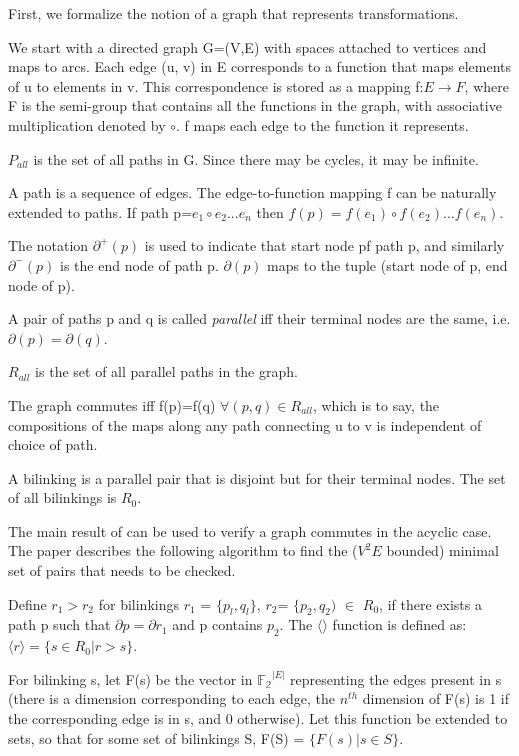 \documentclass{article}
\begin{document}
First, we formalize the notion of a graph that represents transformations.

We start with a directed graph G=(V,E) with spaces attached to vertices and maps to arcs. Each edge (u, v) in E corresponds to a function that maps elements of u to elements in v. 
This correspondence is stored as a mapping f:$E\rightarrow F$, where F is the semi-group that contains all the functions in the graph, with associative multiplication denoted by $\circ$. f maps each edge to the function it represents.

$P_{all}$ is the set of all paths in G. Since there may be cycles, it may be infinite.

A path is a sequence of edges. The edge-to-function mapping f can be naturally extended to paths. If path p=$e_1\circ e_2 ... e_n$ then $f(p)=f(e_1) \circ f(e_2) ... f(e_n)$.

The notation $\partial^{+}(p)$ is used to indicate that start node pf path p, and similarly $\partial^-(p)$ is the end node of path p. $\partial(p)$ maps to the tuple (start node of p, end node of p).

A pair of paths p and q is called \textit{parallel} iff their terminal nodes are the same, i.e. $\partial(p)=\partial(q)$.

$R_{all}$ is the set of all parallel paths in the graph.

The graph commutes iff f(p)=f(q) $\forall (p,q)\in R_{all}$, which is to say, the compositions of the maps along any path connecting u to v is independent of choice of path.

A bilinking is a parallel pair that is disjoint but for their terminal nodes. The set of all bilinkings is $R_0$.


The main result of \cite{commutative} can be used to verify a graph commutes in the acyclic case. The paper describes the following algorithm to find the ($V^2E$ bounded) minimal set of pairs that needs to be checked.

Define $r_1>r_2$ for bilinkings $r_1$ = $\{p_l,q_l\}$, $r_2$= $\{p_2, q_2)$ $\in$ $R_0$, if there exists a path p such that $\partial p=\partial r_1$ and p contains $p_2$.
The $\langle\rangle$ function is defined as:
$\langle r \rangle = \{ s\in R_0| r>s\}$.

For bilinking s, let F(s) be the vector in $\mathbb{F_2}^{|E|}$ representing the edges present in s (there is a dimension corresponding to each edge, the $n^{th}$ dimension of F(s) is 1 if the corresponding edge is in s, and 0 otherwise). Let this function be extended to sets, so that for some set of bilinkings S, F(S) = $\{ F(s) | s\in S \}$.
\end{document}
